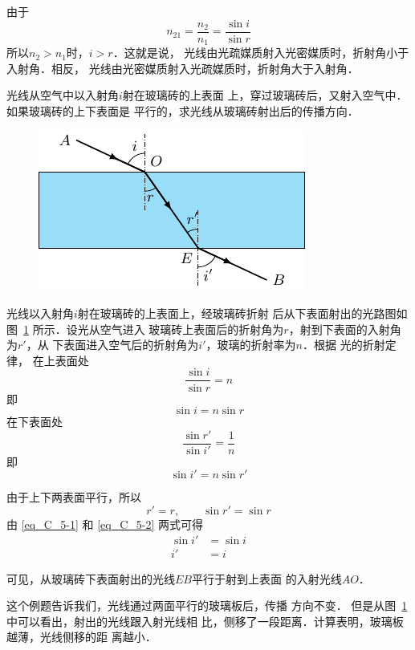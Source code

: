 由于
\[n_{21}=\frac{n_2}{n_1}=\frac{\sin i}{\sin r} \]
所以$n_2>n_1$时，$i>r$．这就是说，
光线由光疏媒质射入光密媒质时，折射角小于入射角．相反，
光线由光密媒质射入光疏媒质时，折射角大于入射角．

\begin{example}
    光线从空气中以入射角$i$射在玻璃砖的上表面
    上，穿过玻璃砖后，又射入空气中．如果玻璃砖的上下表面是
    平行的，求光线从玻璃砖射出后的传播方向．
\end{example}

\begin{figure}[htbp]
    \centering
    \includegraphics{fig/C/5-21.pdf}
    \caption{}\label{fig_C_5-21}
\end{figure}


\begin{solution}
    光线以入射角$i$射在玻璃砖的上表面上，经玻璃砖折射
后从下表面射出的光路图如图~\ref{fig_C_5-21} 所示．设光从空气进入
玻璃砖上表面后的折射角为$r$，射到下表面的入射角为$r'$，从
下表面进入空气后的折射角为$i'$，玻璃的折射率为$n$．根据
光的折射定律，
在上表面处
\[\frac{\sin i}{\sin r}=n \]
即
\begin{equation}\label{eq_C_5-1}
    \sin i=n\sin r 
\end{equation}
在下表面处
\[\frac{\sin r'}{\sin i'}=\frac{1}{n} \]
即
\begin{equation}\label{eq_C_5-2}
    \sin i' =n \sin r'
\end{equation}

由于上下两表面平行，所以
\[r'=r,\qquad \sin r'=\sin r \]
由 \eqref{eq_C_5-1} 和 \eqref{eq_C_5-2} 两式可得
\[\begin{split}
    \sin i'&=\sin i\\
i'&=i    
\end{split}\]

可见，从玻璃砖下表面射出的光线$EB$平行于射到上表面
的入射光线$AO$．
\end{solution}


这个例题告诉我们，光线通过两面平行的玻璃板后，传播
方向不变．
但是从图~\ref{fig_C_5-21} 中可以看出，射出的光线跟入射光线相
比，侧移了一段距离．计算表明，玻璃板越薄，光线侧移的距
离越小．

